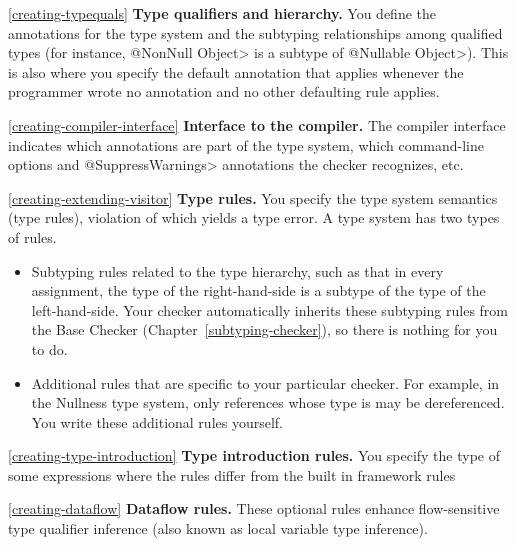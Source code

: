 \begin{description}

\item{\ref{creating-typequals}}
  \textbf{Type qualifiers and hierarchy.}  You define the annotations for
  the type system and the subtyping relationships among qualified types
  (for instance, \<@NonNull Object> is a subtype of \<@Nullable
  Object>).  This is also where you specify the default annotation that
  applies whenever the programmer wrote no annotation and no other defaulting
  rule applies.

\item{\ref{creating-compiler-interface}}
  \textbf{Interface to the compiler.}  The compiler interface indicates
  which annotations are part of the type system, which command-line options
  and \<@SuppressWarnings> annotations the checker recognizes, etc.

\item{\ref{creating-extending-visitor}}
  \textbf{Type rules.}  You specify the type system semantics (type
  rules), violation of which yields a type error.  A type system has two types of
  rules.
\begin{itemize}
\item
  Subtyping rules related to the type hierarchy, such as that in every
  assignment,
  the type of the right-hand-side is a subtype of the type of the left-hand-side.
  Your checker automatically inherits these subtyping rules from the Base
  Checker (Chapter~\ref{subtyping-checker}), so there is nothing for you to do.
\item
  Additional rules that are specific to your particular checker.  For
  example, in the Nullness type system, only references whose type is
   may be dereferenced.  You
  write these additional rules yourself.
\end{itemize}

\item{\ref{creating-type-introduction}}
  \textbf{Type introduction rules.}  You specify the type of some expressions where
the rules differ from the built in framework rules

\item{\ref{creating-dataflow}}
  \textbf{Dataflow rules.}  These optional rules enhance flow-sensitive
  type qualifier inference (also known as local variable type inference).
\end{description}





